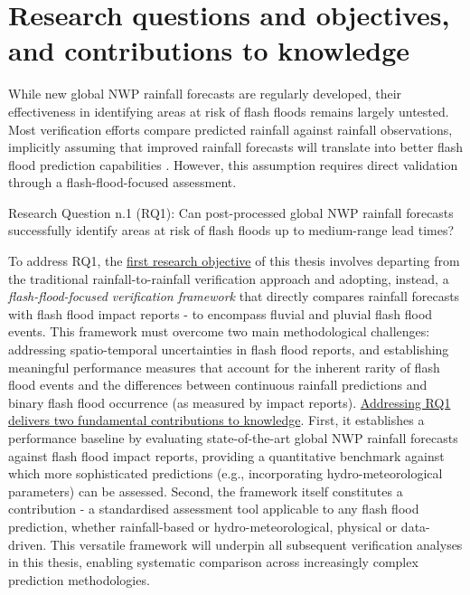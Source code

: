 \section{Research questions and objectives, and contributions to knowledge}
\label{general_introduction_research_questions_objectives_contribution2knowledge}

While  new global NWP rainfall forecasts are regularly developed, their effectiveness in identifying areas at risk of flash floods remains largely untested. Most verification efforts compare predicted rainfall against rainfall observations, implicitly assuming that improved rainfall forecasts will translate into better flash flood prediction capabilities \citep{Gascón_2024}. However, this assumption requires direct validation through a flash-flood-focused assessment. 

\begin{tcolorbox}[
  colframe=colour_chapter5,  
  colback=white,           
  sharp corners,        
  boxrule=2mm,          
  left=0mm,             
  right=0mm,            
  toprule=0mm,          
  bottomrule=0mm,       
  rightrule=2mm        
]
{\color{colour_chapter5} {\setlength{\parindent}{1.0em} Research Question n.1 (RQ1): Can post-processed global NWP rainfall forecasts successfully identify areas at risk of flash floods up to medium-range lead times?}}
\end{tcolorbox}

To address RQ1, the \uline{first research objective} of this thesis involves departing from the traditional rainfall-to-rainfall verification approach and adopting, instead, a \textit{flash-flood-focused verification framework} that directly compares rainfall forecasts with flash flood impact reports - to encompass fluvial and pluvial flash flood events. This framework must overcome two main methodological challenges: addressing spatio-temporal uncertainties in flash flood reports, and establishing meaningful performance measures that account for the inherent rarity of flash flood events and the differences between continuous rainfall predictions and binary flash flood occurrence (as measured by impact reports). \uline{Addressing RQ1 delivers two fundamental contributions to knowledge}. First, it establishes a performance baseline by evaluating state-of-the-art global NWP rainfall forecasts against flash flood impact reports, providing a quantitative benchmark against which more sophisticated predictions (e.g., incorporating hydro-meteorological parameters) can be assessed. Second, the framework itself constitutes a contribution - a standardised assessment tool applicable to any flash flood prediction, whether rainfall-based or hydro-meteorological, physical or data-driven. This versatile framework will underpin all subsequent verification analyses in this thesis, enabling systematic comparison across increasingly complex prediction methodologies.

